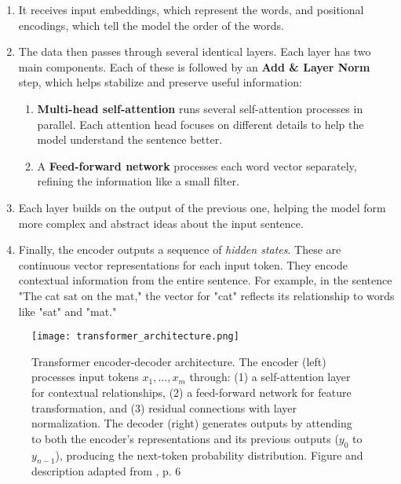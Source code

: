     \begin{enumerate}
        \item It receives input embeddings, which represent the words, and positional encodings, which tell the model the order of the words.
        
        \item The data then passes through several identical layers. Each layer has two main components. Each of these is followed by an \textbf{Add \& Layer Norm} step, which helps stabilize and preserve useful information:
        \begin{enumerate}[label=\alph*.]
            \item \textbf{Multi-head self-attention} runs several self-attention processes in parallel. Each attention head focuses on different details to help the model understand the sentence better.
            \item A \textbf{Feed-forward network} processes each word vector separately, refining the information like a small filter.
    \end{enumerate}
    
    \item Each layer builds on the output of the previous one, helping the model form more complex and abstract ideas about the input sentence.
    
    \item Finally, the encoder outputs a sequence of \textit{hidden states}. These are continuous vector representations for each input token. They encode contextual information from the entire sentence. For example, in the sentence "The cat sat on the mat," the vector for "cat" reflects its relationship to words like "sat" and "mat."
\end{enumerate}

\begin{figure}[ht]
    \centering
	\texttt{[image: transformer\_architecture.png]}	
        \caption[Transformer encoder-decoder architecture overview]{Transformer encoder-decoder architecture. The encoder (left) processes input tokens \(x_1,\dots,x_m\) through: (1) a self-attention layer for contextual relationships, (2) a feed-forward network for feature transformation, and (3) residual connections with layer normalization. The decoder (right) generates outputs by attending to both the encoder's representations and its previous outputs ($y_0$ to $y_{n-1}$), producing the next-token probability distribution. Figure and description adapted from \textcite{xiaoIntroductionTransformersNLP2023}, p. 6}
    \label{fig:transformer_architecture}
\end{figure}

